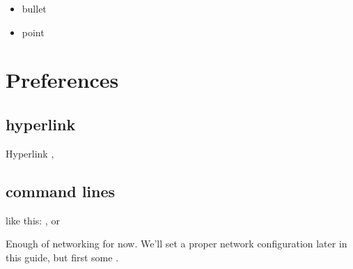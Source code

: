 \documentclass[letterpaper,10pt,openany,oneside,english]{sphinxmanual}
\begin{document}
\begin{itemize}
\item {} 
bullet

\item {} 
point

\end{itemize}


\section{Preferences}
\label{\detokenize{afterinstallconfig:preferences}}\label{\detokenize{afterinstallconfig::doc}}

\subsection{hyperlink}
\label{\detokenize{afterinstallconfig:hyperlink}}
Hyperlink ,


\subsection{command lines}
\label{\detokenize{afterinstallconfig:command-lines}}
like this: ,  or

Enough of networking for now. We’ll set a proper network configuration later in this guide, but first some .
\end{document}
